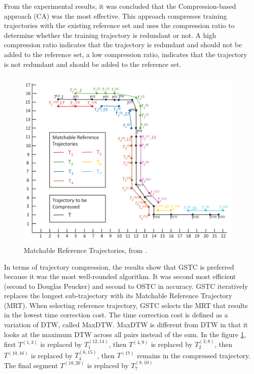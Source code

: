 From the experimental results, it was concluded that the Compression-based approach (CA) was the most effective. This approach compresses training trajectories with the existing reference set and uses the compression ratio to determine whether the training trajectory is redundant or not. A high compression ratio indicates that the trajectory is redundant and should not be added to the reference set, a low compression ratio, indicates that the trajectory is not redundant and should be added to the reference set.
\begin{figure}[h]
    \begin{center}
        \includegraphics[height=9cm, keepaspectratio]{./figures/rest.png}
        \caption{Matchable Reference Trajectories, from \textcite{zhao2018rest}.}
        \label{fig:rest}
    \end{center}
\end{figure}

In terms of trajectory compression, the results show that GSTC is preferred because it was the most well-rounded algorithm. It was second most efficient (second to Douglas Peucker) and second to OSTC in accuracy. GSTC iteratively replaces the longest sub-trajectory with its Matchable Reference Trajectory (MRT). When selecting reference trajectory, GSTC selects the MRT that results in the lowest time correction cost. The time correction cost is defined as a variation of DTW, called MaxDTW. MaxDTW is different from DTW in that it looks at the maximum DTW across all pairs instead of the sum. In the figure \ref{fig:rest}, first $T^{(1,3)}$ is replaced by $T_1^{(12,14)}$, then $T^{(4,9)}$ is replaced by $T_2^{(3,8)}$, then $T^{(10,16)}$ is replaced by $T_4^{(6,15)}$, then $T^{(17)}$ remains in the compressed trajectory. The final segment $T^{(18,20)}$ is replaced by $T_7^{(8,10)}$

